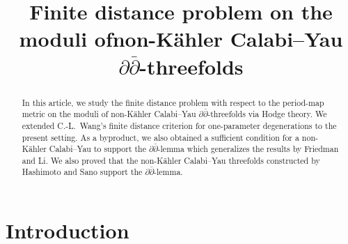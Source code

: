
\title{Finite distance problem on the moduli ofnon-K\"{a}hler Calabi--Yau \(\partial\bar{\partial}\)-threefolds}
\begin{abstract}
In this article, we study the finite distance problem 
with respect to the period-map metric on the moduli of
non-K\"{a}hler Calabi--Yau \(\partial\bar{\partial}\)-threefolds via Hodge theory.
We extended C.-L.~Wang's finite distance criterion for one-parameter degenerations
to the present setting. As a byproduct, we also obtained a
sufficient condition for a non-K\"{a}hler Calabi--Yau to support 
the \(\partial\bar{\partial}\)-lemma which generalizes
the results by Friedman and Li. We also proved that the non-K\"{a}hler Calabi--Yau
threefolds constructed by Hashimoto and Sano support 
the \(\partial\bar{\partial}\)-lemma.
\end{abstract}
\maketitle
\tableofcontents

\section{Introduction}{}

